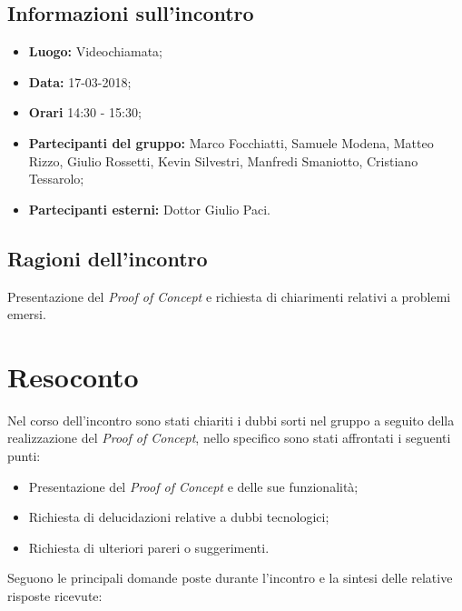\documentclass[openany,12pt,a4paper]{article}
\begin{document}
  \subsection{Informazioni sull'incontro} 
   
  \begin{itemize}  
      \item \textbf{Luogo:} Videochiamata;
      \item \textbf{Data:} 17-03-2018; 
      \item \textbf{Orari} 14:30 - 15:30;
      \item \textbf{Partecipanti del gruppo:} Marco Focchiatti, Samuele Modena, Matteo Rizzo, Giulio Rossetti, Kevin Silvestri, Manfredi Smaniotto, Cristiano Tessarolo; 
      \item \textbf{Partecipanti esterni:} Dottor Giulio Paci. 
  \end{itemize} 
 
  \subsection{Ragioni dell'incontro} 
  Presentazione del \textit{Proof of Concept} e richiesta di chiarimenti relativi a problemi emersi. 
 
  \section{Resoconto} 
  Nel corso dell'incontro sono stati chiariti i dubbi sorti nel gruppo a seguito della realizzazione del \textit{Proof of Concept}, nello specifico sono stati affrontati i seguenti punti:
	
  \begin{itemize}
	\item Presentazione del \textit{Proof of Concept} e delle sue funzionalità;
	\item Richiesta di delucidazioni relative a dubbi tecnologici;
	\item Richiesta di ulteriori pareri o suggerimenti.
  \end{itemize}
	
  \noindent Seguono le principali domande poste durante l'incontro e la sintesi delle relative risposte ricevute:
\end{document}
